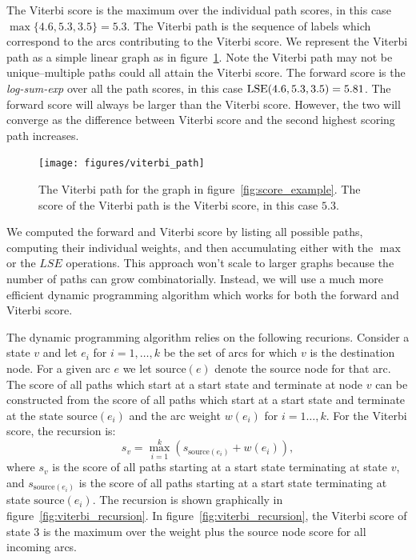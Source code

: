 The Viterbi score is the maximum over the individual path scores, in this case
$\max\{4.6, 5.3, 3.5\} = 5.3$. The Viterbi path is the sequence of labels which
correspond to the arcs contributing to the Viterbi score. We represent the
Viterbi path as a simple linear graph as in figure~\ref{fig:viterbi_path}. Note
the Viterbi path may not be unique--multiple paths could all attain the Viterbi
score. The forward score is the \emph{log-sum-exp} over all the path scores, in
this case $\operatorname*{\textrm{LSE}}(4.6, 5.3, 3.5) = 5.81$. The forward score will always be larger
than the Viterbi score. However, the two will converge as the difference
between Viterbi score and the second highest scoring path increases.

\begin{figure}
    \centering
    \texttt{[image: figures/viterbi\_path]}
    \caption{The Viterbi path for the graph in figure~\ref{fig:score_example}.
    The score of the Viterbi path is the Viterbi score, in this case $5.3$.}
    \label{fig:viterbi_path}
\end{figure}

We computed the forward and Viterbi score by listing all possible paths,
computing their individual weights, and then accumulating either with the
$\max$ or the $LSE$ operations. This approach won't scale to larger graphs
because the number of paths can grow combinatorially. Instead, we will use a
much more efficient dynamic programming algorithm which works for both the
forward and Viterbi score.

The dynamic programming algorithm relies on the following recurions. Consider a
state $v$ and let $e_i$ for $i=1, \ldots, k$ be the set of arcs for which $v$
is the destination node. For a given arc $e$ we let $\textrm{source}(e)$ denote
the source node for that arc. The score of all paths which start at a start
state and terminate at node $v$ can be constructed from the score of all paths
which start at a start state and terminate at the state $\textrm{source}(e_i)$
and the arc weight $w(e_i)$ for $i=1\ldots, k$. For the Viterbi score, the
recursion is:
$$
s_v = \max_{i=1}^k \left( s_{\textrm{source}(e_i)} + w(e_i) \right),
$$
where $s_v$ is the score of all paths starting at a start state terminating at
state $v$, and $s_{\textrm{source}(e_i)}$ is the score of all paths starting at
a start state terminating at state $\textrm{source}(e_i)$. The recursion is
shown graphically in figure~\ref{fig:viterbi_recursion}. In
figure~\ref{fig:viterbi_recursion}, the Viterbi score of state $3$ is the
maximum over the weight plus the source node score for all incoming arcs.

